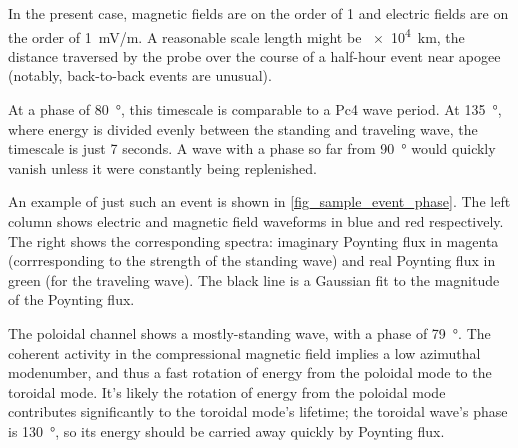 In the present case, magnetic fields are on the order of \SI{1}{\nT} and
electric fields are on the order of \SI{1}{\mV/\m}. A reasonable scale length
might be \SI{e4}{\km}, the distance traversed by the probe over the course of
a half-hour event near apogee (notably, back-to-back events are unusual). 

At a phase of \SI{80}{\degree}, this timescale is comparable to a Pc4 wave
period. At \SI{135}{\degree}, where energy is divided evenly between the
standing and traveling wave, the timescale is just 7 seconds. A wave with a
phase so far from \SI{90}{\degree} would quickly vanish unless it were
constantly being replenished. 

An example of just such an event is shown in \cref{fig_sample_event_phase}.
The left column shows electric and magnetic field waveforms in blue and red
respectively. The right shows the corresponding spectra: imaginary Poynting
flux in magenta (corrresponding to the strength of the standing wave) and real
Poynting flux in green (for the traveling wave). The black line is a Gaussian
fit to the magnitude of the Poynting flux. 

The poloidal channel shows a mostly-standing wave, with a phase of
\SI{79}{\degree}. The coherent activity in the compressional magnetic field
implies a low azimuthal modenumber, and thus a fast rotation of energy from the
poloidal mode to the toroidal mode. It's likely the rotation of energy from the
poloidal mode contributes significantly to the toroidal mode's lifetime; the
toroidal wave's phase is \SI{130}{\degree}, so its energy should be carried
away quickly by Poynting flux. 

